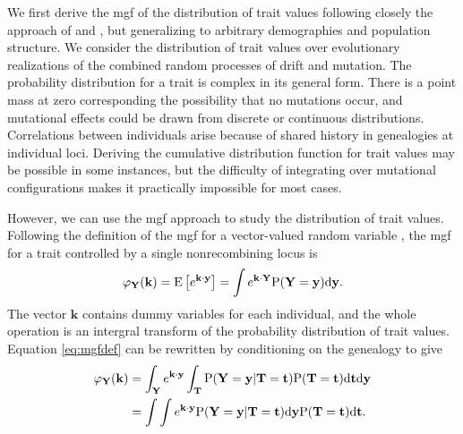 We first derive the mgf of the distribution of trait values following closely
the approach of \citet{Schraiber2015} and \citet{Khaitovich2005}, but
generalizing to arbitrary demographies and population structure. We consider the
distribution of trait values over evolutionary realizations of the combined
random processes of drift and mutation. The probability distribution for a trait
is complex in its general form. There is a point mass at zero corresponding the
possibility that no mutations occur, and mutational effects could be drawn from
discrete or continuous distributions. Correlations between individuals arise
because of shared history in genealogies at individual loci. Deriving the
cumulative distribution function for trait values may be possible in some
instances, but the difficulty of integrating over mutational configurations
makes it practically impossible for most cases.

However, we can use the mgf approach to study the distribution of trait values.
Following the definition of the mgf for a vector-valued random
variable \citep{Ross}, the mgf for a trait controlled by a single nonrecombining
locus is
\begin{equation}
  \label{eq:mgfdef}
  \varphi_{\mathbf{Y}}(\mathbf{k}) = \mathrm{E}\left[ e^{\mathbf{k} \cdot \mathbf{y}} \right] =
  \int e^{\mathbf{k} \cdot \mathbf{Y}} \mathrm{P}(\mathbf{Y}=\mathbf{y}) \mbox{d}\mathbf{y}.
\end{equation}
The vector $\mathbf{k}$ contains dummy variables for each individual, and the
whole operation is an intergral transform of the probability distribution of
trait values. Equation \eqref{eq:mgfdef} can be rewritten by conditioning on the
genealogy to give
\begin{align}
  \label{eq:cond}
  \varphi_{\mathbf{Y}}(\mathbf{k}) &= \int_{\mathbf{Y}} e^{\mathbf{k} \cdot \mathbf{y}}
  \int_{\mathbf{T}} \mathrm{P}(\mathbf{Y}=\mathbf{y} | \mathbf{T}=\mathbf{t}) \mathrm{P}(\mathbf{T}=\mathbf{t})
  \mbox{d}\mathbf{t} \mbox{d}\mathbf{y} \nonumber \\
  &= \int \int e^{\mathbf{k} \cdot \mathbf{y}} \mathrm{P}(\mathbf{Y}=\mathbf{y} | \mathbf{T}=\mathbf{t}) \mbox{d}\mathbf{y}
  \mathrm{P}(\mathbf{T}=\mathbf{t})
  \mbox{d}\mathbf{t}.
\end{align}

